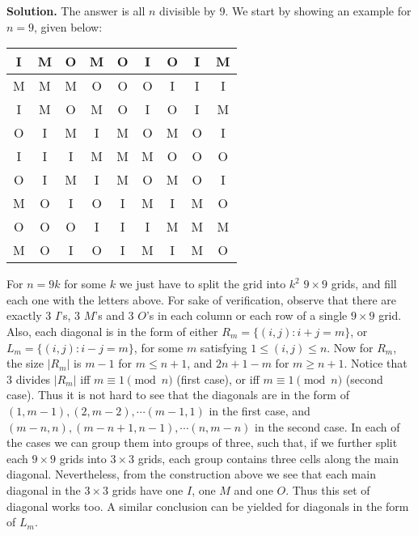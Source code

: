\documentclass[11pt,a4paper]{article}
\begin{document}
\begin{itemize}
\textbf{Solution.} The answer is all $n$ divisible by 9. 
We start by showing an example for $n=9$, given below: 
\begin{center}
\begin{tabular}{|c|c|c||c|c|c||c|c|c|}
\hline
I & M & O & M & O & I & O & I & M\\
\hline
M & M & M & O & O & O & I & I & I\\
\hline
I & M & O & M & O & I & O & I & M\\
\hline
\hline
O & I & M & I & M & O & M & O & I\\
\hline
I & I & I & M & M & M & O & O & O\\
\hline
O & I & M & I & M & O & M & O & I\\
\hline
\hline
M & O & I & O & I & M & I & M & O\\
\hline
O & O & O & I & I & I & M & M & M\\
\hline
M & O & I & O & I & M & I & M & O\\
\hline
\end{tabular}
\end{center}
For $n=9k$ for some $k$ we just have to split the grid into $k^2$ $9\times 9$ grids, and fill each one with the letters above. 
For sake of verification, observe that there are exactly 3 $I$'s, 3 $M$'s and 3 $O$'s in each column or each row of a single $9\times 9$ grid. 
Also, each diagonal is in the form of either $R_m=\{(i, j): i+j=m\}$, or $L_m=\{(i, j): i-j=m\}$, 
for some $m$ satisfying $1\le (i, j)\le n$. 
Now for $R_m$, the size $|R_m|$ is $m-1$ for $m\le n+1$, and $2n+1-m$ for $m\ge n+1$. 
Notice that 3 divides $|R_m|$ iff $m\equiv 1\pmod{n}$ (first case), or iff  $m\equiv 1\pmod{n}$ (second case). 
Thus it is not hard to see that the diagonals are in the form of 
$(1, m-1), (2, m-2), \cdots (m-1, 1)$ in the first case, and 
$(m-n, n), (m-n+1, n-1), \cdots (n, m-n)$ in the second case. 
In each of the cases we can group them into groups of three, such that, if we further split each $9\times 9$ grids into $3\times 3$ grids, each group contains three cells along the main diagonal. 
Nevertheless, from the construction above we see that each main diagonal in the $3\times 3$ grids have one $I$, one $M$ and one $O$. 
Thus this set of diagonal works too. 
A similar conclusion can be yielded for diagonals in the form of $L_m$. 


\end{itemize}
\end{document}
